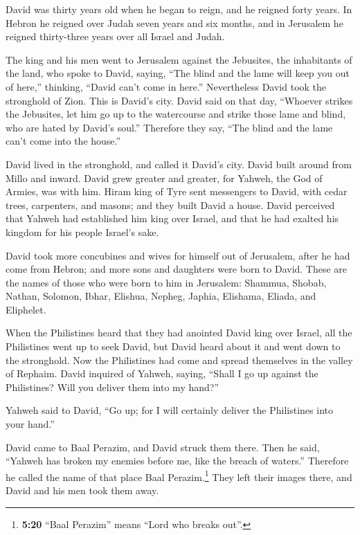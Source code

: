 \begin{paracol}{2}
\begin{otherlanguage}{english}
 David was thirty years old when he began to reign, and he
reigned forty years.  In Hebron he reigned over Judah
seven years and six months, and in Jerusalem he reigned thirty-three
years over all Israel and Judah.

 The king and his men went to Jerusalem against the
Jebusites, the inhabitants of the land, who spoke to David, saying,
``The blind and the lame will keep you out of here,'' thinking, ``David
can't come in here.''  Nevertheless David took the
stronghold of Zion. This is David's city.  David said on
that day, ``Whoever strikes the Jebusites, let him go up to the
watercourse and strike those lame and blind, who are hated by David's
soul.'' Therefore they say, ``The blind and the lame can't come into the
house.''

 David lived in the stronghold, and called it David's
city. David built around from Millo and inward.  David
grew greater and greater, for Yahweh, the God of Armies, was with him.
 Hiram king of Tyre sent messengers to David, with cedar
trees, carpenters, and masons; and they built David a house.
 David perceived that Yahweh had established him king
over Israel, and that he had exalted his kingdom for his people Israel's
sake.

 David took more concubines and wives for himself out of
Jerusalem, after he had come from Hebron; and more sons and daughters
were born to David.  These are the names of those who
were born to him in Jerusalem: Shammua, Shobab, Nathan, Solomon,
 Ibhar, Elishua, Nepheg, Japhia, 
Elishama, Eliada, and Eliphelet.

 When the Philistines heard that they had anointed David
king over Israel, all the Philistines went up to seek David, but David
heard about it and went down to the stronghold.  Now the
Philistines had come and spread themselves in the valley of Rephaim.
 David inquired of Yahweh, saying, ``Shall I go up
against the Philistines? Will you deliver them into my hand?''

Yahweh said to David, ``Go up; for I will certainly deliver the
Philistines into your hand.''

 David came to Baal Perazim, and David struck them there.
Then he said, ``Yahweh has broken my enemies before me, like the breach
of waters.'' Therefore he called the name of that place Baal
Perazim.\footnote{\textbf{5:20} ``Baal Perazim'' means ``Lord who breaks
  out''.}  They left their images there, and David and
his men took them away.


\end{otherlanguage}
\end{paracol}
